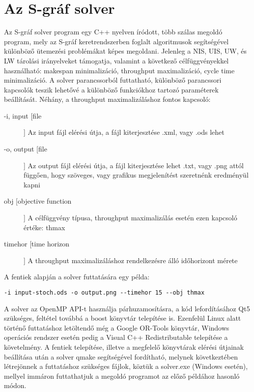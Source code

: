 \chapter{Az S-gráf solver} \label{s-graph_framework}
Az S-gráf solver program egy C++ nyelven íródott, több szálas megoldó program, mely az S-gráf keretrendszerben foglalt algoritmusok segítségével különböző ütemezési problémákat képes megoldani.
Jelenleg a NIS, UIS, UW, és LW tárolási irányelveket támogatja, valamint a következő célfüggvényekkel használható: makespan minimalizáció, throughput maximalizáció, cycle time minimalizáció.
A solver parancssorból futtatható, különböző parancssori kapcsolók teszik lehetővé a különböző funkciókhoz tartozó paraméterek beállítását.
Néhány, a throughput maximalizáláshoz fontos kapcsoló:
\begin{description}
\item[-i, \text{-{}-}input [file]] Az input fájl elérési útja, a fájl kiterjesztése .xml, vagy .ods lehet
\item[-o, \text{-{}-}output [file]] Az output fájl elérési útja, a fájl kiterjesztése lehet .txt, vagy .png attól függően, hogy szöveges, vagy grafikus megjelenítést szeretnénk eredményül kapni
\item[\text{-{}-}obj [objective function]] A célfüggvény típusa, throughput maximalizálás esetén ezen kapcsoló értéke: thmax
\item[\text{-{}-}timehor [time horizon]] A throughput maximalizáláshoz rendelkezésre álló időhorizont mérete 
\end{description}
A fentiek alapján a solver futtatására egy példa:
\begin{center}
\verb|-i input-stoch.ods -o output.png --timehor 15 --obj thmax|
\end{center}
A solver az OpenMP API-t használja párhuzamosításra, a kód lefordításához Qt5 szükséges, feltétel továbbá a boost könyvtár telepítése is.
Ezenfelül Linux alatt történő futtatáshoz letöltendő még a Google OR-Tools könyvtár, Windows operációs rendszer esetén pedig a Visual C++ Redistributable telepítése a követelmény.
A fentiek telepítése, illetve a megfelelő könyvtárak elérési útjainak beállítása után a solver qmake segítségével fordítható, melynek következtében létrejönnek a futtatáshoz szükséges fájlok, köztük a solver.exe (Windows esetén), mellyel immáron futtathatjuk a megoldó programot az előző példához hasonló módon.   
